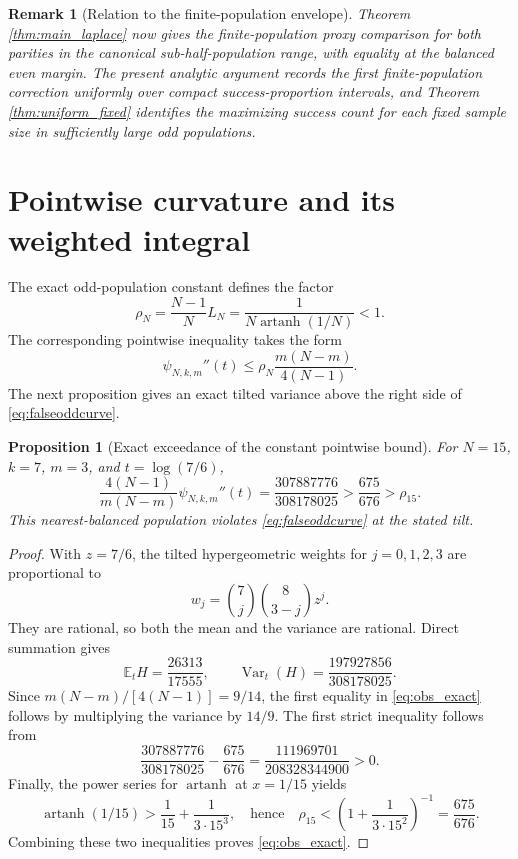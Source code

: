 \documentclass[11pt,a4paper]{article}
\newtheorem{proposition}[theorem]{Proposition}
\newtheorem{remark}[theorem]{Remark}
\newcommand{\E}{\mathbb E}\newcommand{\R}{\mathbb R}\newcommand{\N}{\mathbb N}\newcommand{\one}{\mathbf1}
\begin{document}
\begin{remark}[Relation to the finite-population envelope]
Theorem \ref{thm:main_laplace} now gives the finite-population proxy comparison for both parities in the canonical sub-half-population range, with equality at the balanced even margin. The present analytic argument records the first finite-population correction uniformly over compact success-proportion intervals, and Theorem \ref{thm:uniform_fixed} identifies the maximizing success count for each fixed sample size in sufficiently large odd populations.
\end{remark}



\section{Pointwise curvature and its weighted integral}\label{sec:curvature_obstruction}
The exact odd-population constant defines the factor
\[
 \rho_N=\frac{N-1}{N}L_N=\frac{1}{N\operatorname{artanh}(1/N)}<1.
\]
The corresponding pointwise inequality takes the form
\begin{equation}\label{eq:falseoddcurve}
 \psi_{N,k,m}''(t)\le\rho_N\frac{m(N-m)}{4(N-1)}.
\end{equation}
The next proposition gives an exact tilted variance above the right side of \eqref{eq:falseoddcurve}.

\begin{proposition}[Exact exceedance of the constant pointwise bound]\label{prop:obstruction}
For $N=15$, $k=7$, $m=3$, and $t=\log(7/6)$,
\begin{equation}\label{eq:obs_exact}
 \frac{4(N-1)}{m(N-m)}\psi_{N,k,m}''(t)
 =\frac{307887776}{308178025}
 >\frac{675}{676}>\rho_{15}.
\end{equation}
This nearest-balanced population violates \eqref{eq:falseoddcurve} at the stated tilt.
\end{proposition}

\begin{proof}
With $z=7/6$, the tilted hypergeometric weights for $j=0,1,2,3$ are proportional to
\[
 w_j=\binom7j\binom8{3-j}z^j.
\]
They are rational, so both the mean and the variance are rational. Direct summation gives
\[
 \E_tH=\frac{26313}{17555},\qquad
 \operatorname{Var}_t(H)=\frac{197927856}{308178025}.
\]
Since $m(N-m)/[4(N-1)]=9/14$, the first equality in \eqref{eq:obs_exact} follows by multiplying the variance by $14/9$. The first strict inequality follows from
\[
 \frac{307887776}{308178025}-\frac{675}{676}
 =\frac{111969701}{208328344900}>0.
\]
Finally, the power series for $\operatorname{artanh}$ at $x=1/15$ yields
\[
 \operatorname{artanh}(1/15)>\frac1{15}+\frac1{3\cdot15^3},
 \quad\text{hence}\quad
 \rho_{15}<\left(1+\frac1{3\cdot15^2}\right)^{-1}=\frac{675}{676}.
\]
Combining these two inequalities proves \eqref{eq:obs_exact}.
\end{proof}
\end{document}
